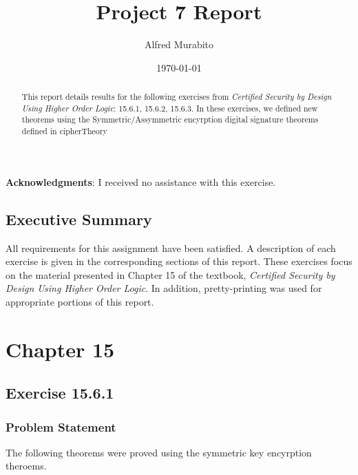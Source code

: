 \documentclass[11pt, twoside]{article}
\title{Project 7 Report}
\author{Alfred Murabito}
\date{\today}
\begin{document}
\maketitle{}

\newpage

\begin{abstract}
This report details results for the following exercises from
\textit{Certified Security by Design Using Higher Order Logic}:
15.6.1, 15.6.2, 15.6.3. In these exercises, we 
defined new theorems using the Symmetric/Assymmetric encyrption 
digital signature theorems defined in cipherTheory
\end{abstract}

\newpage

\textbf{Acknowledgments}: I received no assistance with this exercise.

\newpage

\tableofcontents

\newpage

\section{Executive Summary}
\label{sec:executive-summary}



All requirements for this assignment have been satisfied. A description of each exercise is given in the corresponding sections of this report.  These exercises focus on the material presented in Chapter 15 of the textbook, \textit{Certified Security by Design Using Higher Order Logic}.  In addition, pretty-printing was used for appropriate portions of this report.

\newpage

\chapter{Chapter 15}
\label{cha:chapter-15}

\section{Exercise 15.6.1 }
\label{sec:exercise-15.6.1-}

\subsection{Problem Statement}
\label{sec:problem-statement-1}

The following theorems were proved using the symmetric key encyrption theroems. 
\end{document}

